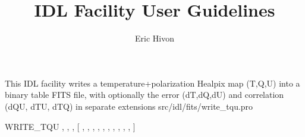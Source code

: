 

\renewcommand{\facname}{{write\_tqu }}
\renewcommand{\FACNAME}{{WRITE\_TQU }}
\sloppy

\title{\healpix IDL Facility User Guidelines}
 \section[write\_tqu]{ }
\label{idl:write_tqu}
\author{Eric Hivon}

\begin{facility}
{This IDL facility writes a temperature+polarization Healpix map (T,Q,U) into a
binary table FITS file, 
with optionally the error (dT,dQ,dU) and correlation (dQU, dTU, dTQ)
in separate extensions
}
{src/idl/fits/write\_tqu.pro}
\end{facility}

\begin{IDLformat}
{\FACNAME, %
, %
, [%
, %
, %
, %
, %
, %
, %
, %
, %
, %
, %
]}
\end{IDLformat}

